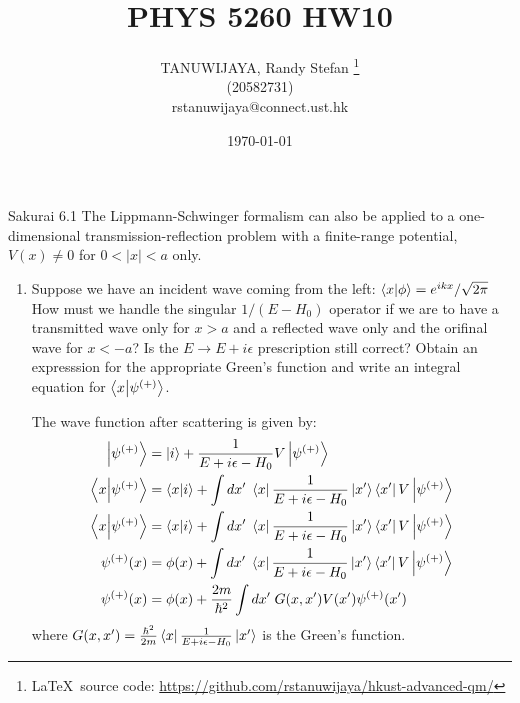\documentclass{article}
\title{PHYS 5260 HW10}
\author{TANUWIJAYA, Randy Stefan \footnote{\LaTeX\ source code: \url{https://github.com/rstanuwijaya/hkust-advanced-qm/}}
\\ (20582731) \\ rstanuwijaya@connect.ust.hk}
\affil{Department of Physics - HKUST}
\date{\today}
\begin{document}
\maketitle
\begin{section}{Sakurai 6.1}
The Lippmann-Schwinger formalism can also be applied to a one-dimensional transmission-reflection problem with a finite-range potential, $V(x) \neq 0$ for $0 < |x| < a$ only.
\begin{enumerate}
	\item Suppose we have an incident wave coming from the left: $\bra{x}\ket{\phi} = e^{ikx}/\sqrt{2\pi}$ How must we handle the singular $1/(E - H_0)$ operator if we are to have a transmitted wave only for $x > a$ and a reflected wave only and the orifinal wave for $x < -a$? Is the $E \to E + i \epsilon$ prescription still correct? Obtain an expresssion for the appropriate Green's function and write an integral equation for $\bra{x}\ket{\psi^{(+)}}$.
	\begin{tcolorbox}[breakable]
		The wave function after scattering is given by:
		\begin{align*}
			\ket{\psi^{(+)}}        & = \ket{i} +  \frac{1}{E + i\epsilon - H_0}V\ket{\psi^{(+)}}                                          \\
			\bra{x}\ket{\psi^{(+)}} & = \bra{x}\ket{i} + \int dx'\; \bra{x}\frac{1}{E + i\epsilon - H_0}\ket{x'} \bra{x'}V\ket{\psi^{(+)}} \\
			\bra{x}\ket{\psi^{(+)}} & = \bra{x}\ket{i} + \int dx'\; \bra{x}\frac{1}{E + i\epsilon - H_0}\ket{x'} \bra{x'}V\ket{\psi^{(+)}} \\
			\psi^{(+)}(x)           & = \phi(x) + \int dx'\; \bra{x}\frac{1}{E + i\epsilon - H_0}\ket{x'} \bra{x'} V \ket{\psi^{(+)}}      \\
			\psi^{(+)}(x)           & = \phi(x) +\frac{2m}{\hbar^2} \int dx'\; G(x, x') V(x') \psi^{(+)}(x')
		\end{align*}
		where $G(x, x') = \frac{\hbar^2}{2m} \bra{x}\frac{1}{E + i\epsilon - H_0}\ket{x'}$ is the Green's function.


\end{tcolorbox}
\end{enumerate}
\end{section}
\end{document}
